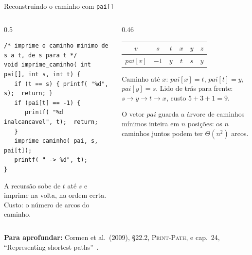 \documentclass[aspectratio=169,xcolor=table]{beamer}
\newcommand{\fonte}[1]{%
  \vfill
  {\tiny\color{gray!55!black}\textbf{Para aprofundar:} #1\par}%
}
\begin{document}
\begin{frame}[fragile]{Reconstruindo o caminho com \texttt{pai[]}}
  \begin{columns}[T]
    \begin{column}{0.5\textwidth}
\begin{lstlisting}[basicstyle=\ttfamily\tiny]
/* imprime o caminho minimo de s a t, de s para t */
void imprime_caminho( int pai[], int s, int t) {
   if (t == s) { printf( "%d", s);  return; }
   if (pai[t] == -1) {
      printf( "%d inalcancavel", t);  return;
   }
   imprime_caminho( pai, s, pai[t]);
   printf( " -> %d", t);
}
\end{lstlisting}
      \scriptsize
      A recursão sobe de $t$ até $s$ e imprime na volta, na ordem certa. Custo: o número de
      arcos do caminho.
    \end{column}
    \begin{column}{0.46\textwidth}
      \begin{center}
      \scriptsize
      \begin{tabular}{cccccc}
        \toprule
        $v$ & $s$ & $t$ & $x$ & $y$ & $z$ \\
        \midrule
        $\mathit{pai}[v]$ & $-1$ & $y$ & $t$ & $s$ & $y$ \\
        \bottomrule
      \end{tabular}
      \end{center}
      \scriptsize
      Caminho até $x$: $\mathit{pai}[x] = t$, $\mathit{pai}[t] = y$, $\mathit{pai}[y] = s$.
      Lido de trás para frente: $s \to y \to t \to x$, custo $5 + 3 + 1 = 9$.
      \medskip

      O vetor $\mathit{pai}$ guarda a árvore de caminhos mínimos inteira em $n$ posições:
      os $n$ caminhos juntos podem ter $\Theta(n^2)$ arcos.
    \end{column}
  \end{columns}
  \fonte{Cormen et al.\ (2009), \S 22.2, \textsc{Print-Path}, e cap.~24, ``Representing
    shortest paths''~\cite{cormen2009introduction}.}
\end{frame}
\end{document}
